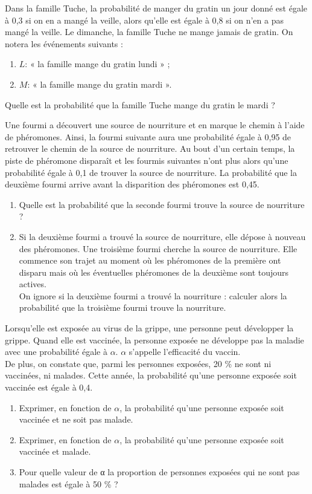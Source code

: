 \documentclass[a4paper,11pt,exos]{nsi} %
\begin{document}
\exo{}
Dans la famille Tuche, la probabilité de manger du gratin un jour donné est égale à 0,3 si on en a mangé la veille, alors qu'elle est égale à 0,8 si on n'en a pas mangé la veille. Le dimanche, la famille Tuche ne mange jamais de gratin.
On notera les événements suivants :
\begin{enumerate}[label=\textbullet]
    \item $L$: « la famille mange du gratin lundi » ;
    \item $M$: « la famille mange du gratin mardi ».
\end{enumerate}
Quelle est la probabilité que la famille Tuche mange du gratin le mardi ?

\exo{}
Une fourmi a découvert une source de nourriture et en marque le chemin à l'aide de phéromones. Ainsi, la fourmi suivante aura une probabilité égale à 0,95 de retrouver le chemin de la source de nourriture. Au bout d'un certain temps, la piste de phéromone disparaît et les fourmis suivantes n'ont plus alors qu'une probabilité égale à 0,1 de trouver la source de nourriture. La probabilité que la deuxième fourmi arrive avant la disparition des phéromones est 0,45.
\begin{enumerate}
    \item Quelle est la probabilité que la seconde fourmi trouve la source de nourriture ?
    \item Si la deuxième fourmi a trouvé la source de nourriture, elle dépose à nouveau des phéromones. Une troisième fourmi cherche la source de nourriture. Elle commence son trajet au moment où les phéromones de la première ont disparu mais où les éventuelles phéromones de la deuxième sont toujours actives.\\
    On ignore si la deuxième fourmi a trouvé la nourriture : calculer alors la probabilité que la troisième fourmi trouve la nourriture.
\end{enumerate}

\exo{}
Lorsqu'elle est exposée au virus de la grippe, une personne peut développer la grippe. Quand elle est vaccinée, la personne exposée ne développe pas la maladie avec une probabilité égale à $\alpha$. $\alpha$ s'appelle l'efficacité du vaccin.\\
De plus, on constate que, parmi les personnes exposées, 20 \% ne sont ni vaccinées, ni malades. Cette année, la probabilité qu'une personne exposée soit vaccinée est égale à 0,4.
\begin{enumerate}
    \item Exprimer, en fonction de $\alpha$, la probabilité qu'une personne exposée soit vaccinée et ne soit pas malade.
    \item Exprimer, en fonction de $\alpha$, la probabilité qu'une personne exposée soit vaccinée et malade.
    \item Pour quelle valeur de α la proportion de personnes exposées qui ne sont pas malades est égale à 50 \% ?
\end{enumerate}
\end{document}
